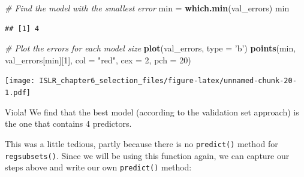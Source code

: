 \documentclass[
]{article}
\newenvironment{Shaded}{\begin{snugshade}}{\end{snugshade}}
\newcommand{\CommentTok}[1]{\textcolor[rgb]{0.56,0.35,0.01}{\textit{#1}}}
\newcommand{\ControlFlowTok}[1]{\textcolor[rgb]{0.13,0.29,0.53}{\textbf{#1}}}
\newcommand{\DataTypeTok}[1]{\textcolor[rgb]{0.13,0.29,0.53}{#1}}
\newcommand{\DecValTok}[1]{\textcolor[rgb]{0.00,0.00,0.81}{#1}}
\newcommand{\KeywordTok}[1]{\textcolor[rgb]{0.13,0.29,0.53}{\textbf{#1}}}
\newcommand{\NormalTok}[1]{#1}
\newcommand{\OperatorTok}[1]{\textcolor[rgb]{0.81,0.36,0.00}{\textbf{#1}}}
\newcommand{\StringTok}[1]{\textcolor[rgb]{0.31,0.60,0.02}{#1}}
\begin{document}
\begin{Shaded}
\begin{Highlighting}[]
\CommentTok{# Find the model with the smallest error}
\NormalTok{min =}\StringTok{ }\KeywordTok{which.min}\NormalTok{(val_errors)}
\NormalTok{min}
\end{Highlighting}
\end{Shaded}

\begin{verbatim}
## [1] 4
\end{verbatim}

\begin{Shaded}
\begin{Highlighting}[]
\CommentTok{# Plot the errors for each model size}
\KeywordTok{plot}\NormalTok{(val_errors, }\DataTypeTok{type =} \StringTok{'b'}\NormalTok{)}
\KeywordTok{points}\NormalTok{(min, val_errors[min][}\DecValTok{1}\NormalTok{], }\DataTypeTok{col =} \StringTok{"red"}\NormalTok{, }\DataTypeTok{cex =} \DecValTok{2}\NormalTok{, }\DataTypeTok{pch =} \DecValTok{20}\NormalTok{)}
\end{Highlighting}
\end{Shaded}

\texttt{[image: ISLR\_chapter6\_selection\_files/figure-latex/unnamed-chunk-20-1.pdf]}

Viola! We find that the best model (according to the validation set
approach) is the one that contains 4 predictors.

This was a little tedious, partly because there is no \texttt{predict()}
method for \texttt{regsubsets()}. Since we will be using this function
again, we can capture our steps above and write our own
\texttt{predict()} method:

\begin{Shaded}
\end{Shaded}
\end{document}
